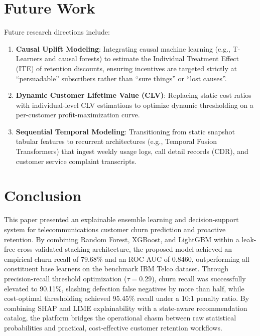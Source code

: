 \documentclass[conference]{IEEEtran}
\begin{document}
\section{Future Work}
Future research directions include:
\begin{enumerate}
    \item \textbf{Causal Uplift Modeling}: Integrating causal machine learning (e.g., T-Learners and causal forests) to estimate the Individual Treatment Effect (ITE) of retention discounts, ensuring incentives are targeted strictly at ``persuadable'' subscribers rather than ``sure things'' or ``lost causes''.
    \item \textbf{Dynamic Customer Lifetime Value (CLV)}: Replacing static cost ratios with individual-level CLV estimations to optimize dynamic thresholding on a per-customer profit-maximization curve.
    \item \textbf{Sequential Temporal Modeling}: Transitioning from static snapshot tabular features to recurrent architectures (e.g., Temporal Fusion Transformers) that ingest weekly usage logs, call detail records (CDR), and customer service complaint transcripts.
\end{enumerate}

\section{Conclusion}
This paper presented an explainable ensemble learning and decision-support system for telecommunications customer churn prediction and proactive retention. By combining Random Forest, XGBoost, and LightGBM within a leak-free cross-validated stacking architecture, the proposed model achieved an empirical churn recall of 79.68\% and an ROC-AUC of 0.8460, outperforming all constituent base learners on the benchmark IBM Telco dataset. Through precision-recall threshold optimization ($\tau=0.29$), churn recall was successfully elevated to 90.11\%, slashing defection false negatives by more than half, while cost-optimal thresholding achieved 95.45\% recall under a 10:1 penalty ratio. By combining SHAP and LIME explainability with a state-aware recommendation catalog, the platform bridges the operational chasm between raw statistical probabilities and practical, cost-effective customer retention workflows.
\end{document}
